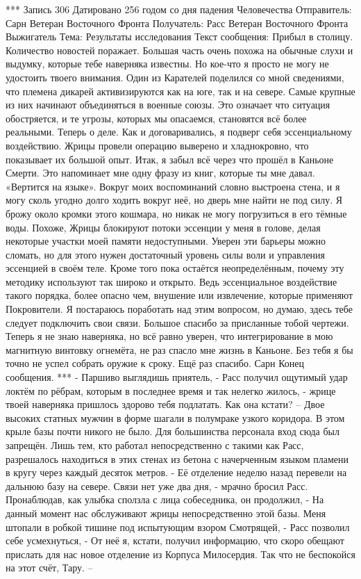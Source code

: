 \documentclass[a4paper, 12pt]{report}
\begin{document}
***
Запись 306
Датировано 256 годом со дня падения Человечества
Отправитель: Сарн Ветеран Восточного Фронта
Получатель: Расс Ветеран Восточного Фронта Выжигатель
Тема: Результаты исследования
Текст сообщения:
	 Прибыл в столицу. Количество новостей поражает. Большая часть очень похожа на обычные слухи и выдумку, которые тебе наверняка известны. Но кое-что я просто не могу не удостоить твоего внимания.
 Один из Карателей поделился со мной сведениями, что племена дикарей активизируются как на юге, так и на севере. Самые крупные из них начинают объединяться в военные союзы. Это означает что ситуация обостряется, и те угрозы, которых мы опасаемся, становятся всё более реальными.
Теперь о деле. Как и договаривались, я подверг себя эссенциальному воздействию. Жрицы провели операцию выверено и хладнокровно, что показывает их большой опыт.
Итак, я забыл всё через что прошёл в Каньоне Смерти. Это напоминает мне одну фразу из книг, которые ты мне давал. «Вертится на языке». Вокруг моих воспоминаний словно выстроена стена, и я могу сколь угодно долго ходить вокруг неё, но дверь мне найти не под силу. Я брожу около кромки этого кошмара, но никак не могу погрузиться в его тёмные воды. Похоже, Жрицы блокируют потоки эссенции у меня в голове, делая некоторые участки моей памяти недоступными. Уверен эти барьеры можно сломать, но для этого нужен достаточный уровень силы воли и управления эссенцией в своём теле. Кроме того пока остаётся неопределённым, почему эту методику используют так широко и открыто. Ведь эссенциальное воздействие такого порядка, более опасно чем, внушение или извлечение, которые применяют Покровители. Я постараюсь поработать над этим вопросом, но думаю, здесь тебе следует подключить свои связи.
Большое спасибо за присланные тобой чертежи. Теперь я не знаю наверняка, но всё равно уверен, что интегрирование в мою магнитную винтовку огнемёта, не раз спасло мне жизнь в Каньоне. Без тебя я бы точно не успел собрать оружие к сроку. Ещё раз спасибо.
Сарн
Конец сообщения. 
***
	- Паршиво выглядишь приятель, - Расс получил ощутимый удар локтём по рёбрам, которым в последнее время и так нелегко жилось, - жрице твоей наверняка пришлось здорово тебя подлатать. Как она кстати? –
	Двое высоких статных мужчин в форме шагали в полумраке узкого коридора. В этом крыле базы почти никого не было. Для большинства персонала вход сюда был запрещён. Лишь тем, кто работал непосредственно с такими как Расс, разрешалось находиться в этих стенах из бетона с начерченным языком пламени в кругу через каждый десяток метров.
	- Её отделение неделю назад перевели на дальнюю базу на севере. Связи нет уже два дня, - мрачно бросил Расс. Пронаблюдав, как улыбка сползла с лица собеседника, он продолжил, - На данный момент нас обслуживают жрицы непосредственно этой базы. Меня штопали в робкой тишине под испытующим взором Смотрящей, - Расс позволил себе усмехнуться, - От неё я, кстати, получил информацию, что скоро обещают прислать для нас новое отделение из Корпуса Милосердия. Так что не беспокойся на этот счёт, Тару. –
\end{document}
